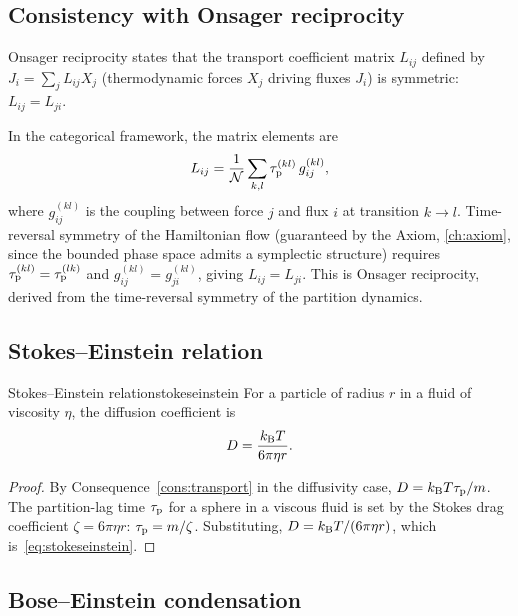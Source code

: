 \subsection{Consistency with Onsager reciprocity}

Onsager reciprocity states that the transport coefficient matrix
$L_{ij}$ defined by $J_i = \sum_j L_{ij} X_j$ (thermodynamic forces
$X_j$ driving fluxes $J_i$) is symmetric: $L_{ij} = L_{ji}$.

In the categorical framework, the matrix elements are
\[
  L_{ij}
  = \frac{1}{\mathcal{N}}\sum_{k,l}\tau_{\mathrm{p}}^{(kl)}\,g_{ij}^{(kl)},
\]
where $g_{ij}^{(kl)}$ is the coupling between force $j$ and flux $i$
at transition $k \to l$.  Time-reversal symmetry of the Hamiltonian flow
(guaranteed by the Axiom, \cref{ch:axiom}, since the bounded phase space
admits a symplectic structure) requires $\tau_{\mathrm{p}}^{(kl)} = \tau_{\mathrm{p}}^{(lk)}$
and $g_{ij}^{(kl)} = g_{ji}^{(kl)}$, giving $L_{ij} = L_{ji}$.
This is Onsager reciprocity, derived from the time-reversal symmetry of
the partition dynamics.

\subsection{Stokes--Einstein relation}

\begin{consequence}{Stokes--Einstein relation}{stokeseinstein}
For a particle of radius $r$ in a fluid of viscosity $\eta$, the diffusion coefficient is
\begin{equation}
D=\frac{k_{\mathrm{B}} T}{6\pi\eta r}.
\label{eq:stokeseinstein}
\end{equation}
\end{consequence}

\begin{proof}
By Consequence~\ref{cons:transport} in the diffusivity case, $D=k_{\mathrm{B}} T\tau_{\mathrm{p}}/m$. The partition-lag time $\tau_{\mathrm{p}}$ for a sphere in a viscous fluid is set by the Stokes drag coefficient $\zeta=6\pi\eta r$: $\tau_{\mathrm{p}}=m/\zeta$. Substituting, $D=k_{\mathrm{B}} T/(6\pi\eta r)$, which is~\eqref{eq:stokeseinstein}.
\end{proof}

\subsection{Bose--Einstein condensation}

